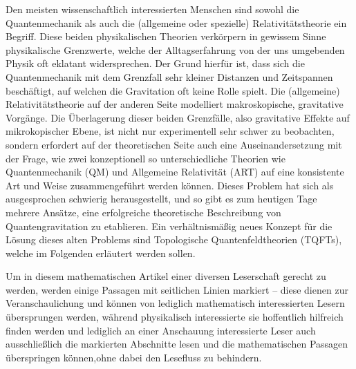 Den meisten wissenschaftlich interessierten Menschen sind sowohl die
Quantenmechanik als auch die (allgemeine oder spezielle)
Relativitätstheorie ein Begriff. Diese beiden physikalischen Theorien
verkörpern in gewissem Sinne physikalische Grenzwerte, welche der
Alltagserfahrung von der uns umgebenden Physik oft eklatant
widersprechen. Der Grund hierfür ist, dass sich die Quantenmechanik
mit dem Grenzfall sehr kleiner Distanzen und Zeitspannen beschäftigt,
auf welchen die Gravitation oft keine Rolle spielt. Die (allgemeine)
Relativitätstheorie auf der anderen Seite modelliert makroskopische,
gravitative Vorgänge. Die Überlagerung dieser beiden Grenzfälle, also
gravitative Effekte auf mikrokopischer Ebene, ist nicht nur
experimentell sehr schwer zu beobachten, sondern erfordert auf der
theoretischen Seite auch eine Auseinandersetzung mit der Frage, wie
zwei konzeptionell so unterschiedliche Theorien wie Quantenmechanik
(QM) und Allgemeine Relativität (ART) auf eine konsistente Art und
Weise zusammengeführt werden können. Dieses Problem hat sich als
ausgesprochen schwierig herausgestellt, und so gibt es zum heutigen
Tage mehrere Ansätze, eine erfolgreiche theoretische Beschreibung von
Quantengravitation zu etablieren. Ein verhältnismäßig neues Konzept
für die Lösung dieses alten Problems sind Topologische
Quantenfeldtheorien (TQFTs), welche im Folgenden erläutert werden
sollen.

Um in diesem mathematischen Artikel einer diversen Leserschaft gerecht
zu werden, werden einige Passagen mit seitlichen Linien markiert --
diese dienen zur Veranschaulichung und können von lediglich
mathematisch interessierten Lesern übersprungen werden, während
physikalisch interessierte sie hoffentlich hilfreich finden werden
und lediglich an einer Anschauung interessierte Leser auch
ausschließlich die markierten Abschnitte lesen und die mathematischen
Passagen überspringen können,ohne dabei den Lesefluss zu behindern.
